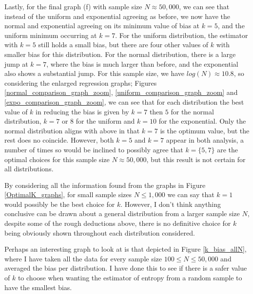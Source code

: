 \documentclass[12pt]{report}
\begin{document}
Lastly, for the final graph (f) with sample size $N \approx 50,000$, we can see that instead of the uniform and exponential agreeing as before, we now have the normal and exponential agreeing on its minimum value of bias at $k=5$, and the uniform minimum occurring at $k=7$. For the uniform distribution, the estimator with $k=5$ still holds a small bias, but there are four other values of $k$ with smaller bias for this distribution. For the normal distribution, there is a large jump at $k=7$, where the bias is much larger than before, and the exponential also shows a substantial jump. For this sample size, we have $log(N) \approx 10.8$, so considering the enlarged regression graphs; Figures \ref{normal_comparison_graph_zoom}, \ref{uniform_comparison_graph_zoom} and \ref{expo_comparison_graph_zoom}, we can see that for each distribution the best value of $k$ in reducing the bias is given by $k=7$ then $5$ for the normal distribution, $k=7$ or $8$ for the uniform and $k=10$ for the exponential. Only the normal distribution aligns with above in that $k=7$ is the optimum value, but the rest does no coincide. However, both $k=5$ and $k=7$ appear in both analysis, a number of times so would be inclined to possibly agree that $k= \{5, 7\}$ are the optimal choices for this sample size $N \approx 50,000$, but this result is not certain for all distributions. 


By considering all the information found from the graphs in Figure \ref{OptimalK_graphs}, for small sample sizes $N \leq 1,000$ we can say that $k=1$ would possibly be the best choice for $k$. However, I don't think anything conclusive can be drawn about a general distribution from a larger sample size $N$, despite some of the rough deductions above, there is no definitive choice for $k$ being obviously shown throughout each distribution considered. 

Perhaps an interesting graph to look at is that depicted in Figure \ref{k_bias_allN}, where I have taken all the data for every sample size $100 \leq N \leq 50,000$ and averaged the bias per distribution. I have done this to see if there is a safer value of $k$ to choose when wanting the estimator of entropy from a random sample to have the smallest bias.
\end{document}
